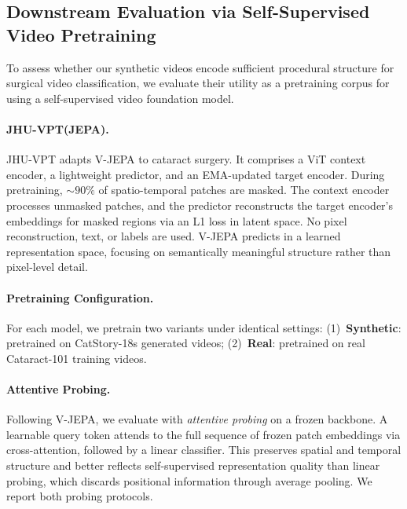 \documentclass[runningheads]{llncs}
\begin{document}
\subsection{Downstream Evaluation via Self-Supervised Video Pretraining}

To assess whether our synthetic videos encode sufficient procedural structure for surgical video classification, we evaluate their utility as a pretraining corpus for using a self-supervised video foundation model.

\paragraph{JHU-VPT(JEPA).}
JHU-VPT adapts V-JEPA\cite{bardes2024vjepa} to cataract surgery. It comprises a ViT context encoder, a lightweight predictor, and an EMA-updated target encoder. During pretraining, ${\sim}90\%$ of spatio-temporal patches are masked. The context encoder processes unmasked patches, and the predictor reconstructs the target encoder's embeddings for masked regions via an L1 loss in latent space. No pixel reconstruction, text, or labels are used. V-JEPA predicts in a learned representation space, focusing on semantically meaningful structure rather than pixel-level detail.


\paragraph{Pretraining Configuration.}
For each model, we pretrain two variants under identical settings:
(1)~\textbf{Synthetic}: pretrained on CatStory-18s generated videos;
(2)~\textbf{Real}: pretrained on real Cataract-101 training videos.

\paragraph{Attentive Probing.}
Following V-JEPA\cite{bardes2024vjepa}, we evaluate with \textit{attentive probing} on a frozen backbone. A learnable query token attends to the full sequence of frozen patch embeddings via cross-attention, followed by a linear classifier. This preserves spatial and temporal structure and better reflects self-supervised representation quality than linear probing, which discards positional information through average pooling. We report both probing protocols.
\end{document}
